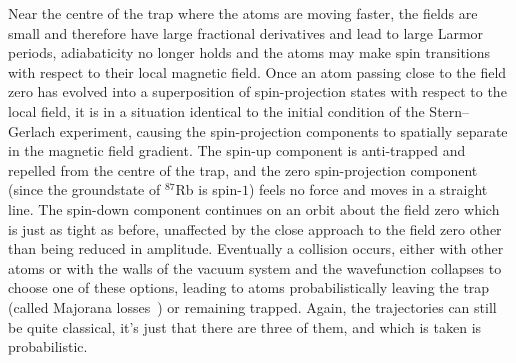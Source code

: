 Near the centre of the trap where the atoms are moving faster, the fields are small and therefore have large fractional derivatives and lead to large Larmor periods, adiabaticity no longer holds and the atoms may make spin transitions with respect to their local magnetic field. Once an atom passing close to the field zero has evolved into a superposition of spin-projection states with respect to the local field, it is in a situation identical to the initial condition of the Stern--Gerlach experiment, causing the spin-projection components to spatially separate in the magnetic field gradient. The spin-up component is anti-trapped and repelled from the centre of the trap, and the zero spin-projection component (since the groundstate of $^{87}$Rb is spin-$1$) feels no force and moves in a straight line. The spin-down component continues on an orbit about the field zero which is just as tight as before, unaffected by the close approach to the field zero other than being reduced in amplitude. Eventually a collision occurs, either with other atoms or with the walls of the vacuum system and the wavefunction collapses to choose one of these options, leading to atoms probabilistically leaving the trap (called Majorana losses~\cite{Majorana1932, PhysRevLett.74.3352}) or remaining trapped. Again, the trajectories can still be quite classical, it's just that there are three of them, and which is taken is probabilistic.


